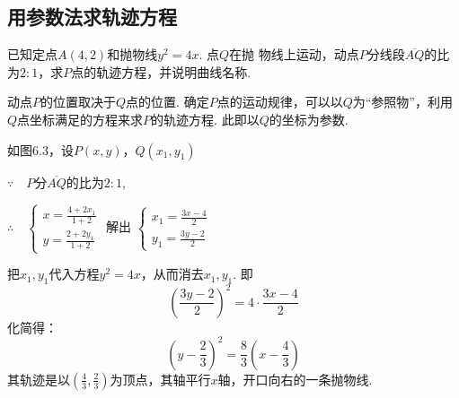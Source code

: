 \subsection{用参数法求轨迹方程}
\noindent
\begin{minipage}{.5\textwidth}
\CTEXindent
\begin{example}
    已知定点$A(4,2)$和抛物线$y^2=4x$. 点$Q$在抛
物线上运动，动点$P$分线段$\overline{AQ}$的比为$2:1$，求$P$点的轨迹方程，并说明曲线名称.
\end{example}

\begin{analyze}
    动点$P$的位置取决于$Q$点的位置. 确定$P$点的运动规律，可以以$Q$为“参照物”，利用$Q$点坐标满足的方程来求$P$的轨迹方程. 此即以$Q$的坐标为参数.
\end{analyze}
\end{minipage}\hfill
\begin{minipage}{.45\textwidth}
    \centering
{}    
\end{minipage}

\begin{solution}
如图6.3，设$P(x,y)$，$Q(x_1,y_1)$

$\because\quad P$分$\overline{AQ}$的比为$2:1$,

$\therefore\quad \begin{cases}
    x=\frac{4+2x_1}{1+2}\\[1.5ex]
    y=\frac{2+2y_1}{1+2}
\end{cases}$
解出
$\begin{cases}
    x_1=\frac{3x-4}{2}\\[1.5ex] y_1=\frac{3y-2}{2}
\end{cases}$

把$x_1,y_1$代入方程$y^2=4x$，从而消去$x_1,y_1$. 即
    \[\left(\frac{3y-2}{2}\right)^2=4\cdot \frac{3x-4}{2}\]
    化简得：$$\left(y-\frac{2}{3}\right)^2=\frac{8}{3}\left(x-\frac{4}{3}\right)$$
    其轨迹是以$\left(\frac{4}{3},\frac{2}{3}\right)$为顶点，其轴平行$x$轴，开口向右的一条抛物线.
\end{solution}

